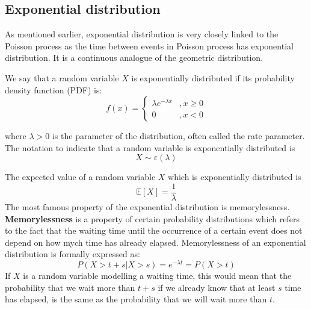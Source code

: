 \documentclass[times, utf8, diplomski]{fer}
\begin{document}
		\subsection{Exponential distribution}
		As mentioned earlier, exponential distribution is very closely linked to the Poisson process as the time between events in Poisson process has exponential distribution. It is a continuous analogue of the geometric distribution.
			\begin{definition}
			\label{exponential}
			We say that a random variable $X$ is exponentially distributed if its probability density function (PDF) is:
			\begin{equation}
				f(x) = \left\{ \begin{array}{lc} \lambda e^{-\lambda x} &, x \geq 0 \\
												0 &, x < 0 \end{array}\right.
			\end{equation}

			\noindent where $\lambda > 0$ is the parameter of the distribution, often called the rate parameter. The notation to indicate that a random variable is exponentially distributed is $$X \sim \varepsilon(\lambda)$$
			\end{definition}

			\noindent The expected value of a random variable $X$ which is exponentially distributed is \begin{equation} \mathbb{E}[X] = \frac{1}{\lambda} \end{equation} The most famous property of the exponential distribution is memorylessness. \textbf{Memorylessness} is a property of certain probability distributions which refers to the fact that the waiting time until the occurrence of a certain event does not depend on how mych time has already elapsed. Memorylessness of an exponential distribution is formally expressed as: \begin{equation} P(X > t + s | X>s) = e^{-\lambda t} = P(X > t) \end{equation} If $X$ is a random variable modelling a waiting time, this would mean that the probability that we wait more than $t+s$ if we already know that at least $s$ time has elapsed, is the same as the probability that we will wait more than $t$. 
\end{document}
